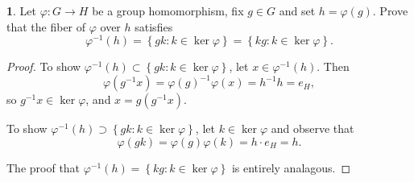 \documentclass[12pt]{article}
\theoremstyle{definition}
\newtheorem{ex}{}
\begin{document}
\begin{ex}
	Let $\varphi : G \to H$ be a group homomorphism, fix $g \in G$ and set $h = \varphi(g)$.
	Prove that the fiber of $\varphi$ over $h$ satisfies \begin{equation*}
		\varphi^{-1}(h) = \left\lbrace gk : k \in \ker \varphi \right\rbrace = \left\lbrace kg : k \in \ker \varphi \right\rbrace.
	\end{equation*}
\end{ex}
\begin{proof}
	To show $\varphi^{-1}(h) \subset \left\lbrace gk : k \in \ker \varphi \right\rbrace$, let $x \in \varphi^{-1}(h)$.
	Then \begin{equation*}
		\varphi(g^{-1}x) = \varphi(g)^{-1}\varphi(x) = h^{-1}h = e_H,
	\end{equation*}
	so $g^{-1}x \in \ker\varphi$, and $x = g \left( g^{-1}x \right)$.

	To show $\varphi^{-1}(h) \supset \left\lbrace gk : k \in \ker \varphi \right\rbrace$, let $k \in \ker\varphi$ and observe that \begin{equation*}
		\varphi(gk) = \varphi(g)\varphi(k) = h\cdot e_H = h.
	\end{equation*}

	The proof that $\varphi^{-1}(h) = \left\lbrace kg : k \in \ker \varphi \right\rbrace$ is entirely analagous.
\end{proof}
\end{document}
